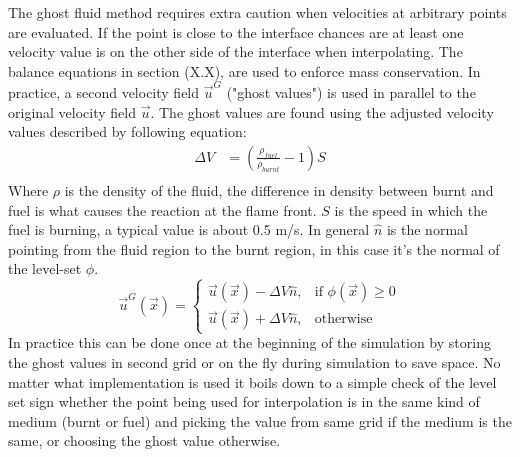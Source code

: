 The ghost fluid method requires extra caution when velocities at arbitrary points are evaluated. If the point is close to the interface chances are at least one velocity value is on the other side of the interface when interpolating. The balance equations in section (X.X), are used to enforce mass conservation. In practice, a second velocity field \begin{math}\vec{u}^{ G}\end{math} ("ghost values") is used in parallel to the original velocity field \begin{math}\vec{u}\end{math}. The ghost values are found using the adjusted velocity values described by following equation:
\begin{align}
\Delta V  & = (\frac{\rho_{fuel}}{\rho_{burnt}} - 1)S \\
\end{align}
Where $\rho $ is the density of the fluid, the difference in density between burnt and fuel is what causes the reaction at the flame front. $S$ is the speed in which the fuel is burning, a typical value is about 0.5 m/s. In general $ \hat n$ is the normal pointing from the fluid region to the burnt region, in this case it's the normal of the level-set $ \phi $.
\begin{equation}
    \vec{u}^{G}(\vec{x})= 
\begin{cases}
    \vec{u}(\vec{x})-\Delta V \hat{n},& \text{if } \phi (\vec{x}) \geq 0\\
    \vec{u}(\vec{x})+\Delta V \hat{n},                    & \text{otherwise}
\end{cases}
\end{equation}
In practice this can be done once at the beginning of the simulation by storing the ghost values in second grid or on the fly during simulation to save space. No matter what implementation is used it boils down to a simple check of the level set sign whether the point being used for interpolation is in the same kind of medium (burnt or fuel) and picking the value from same grid if the medium is the same, or choosing the ghost value otherwise. 